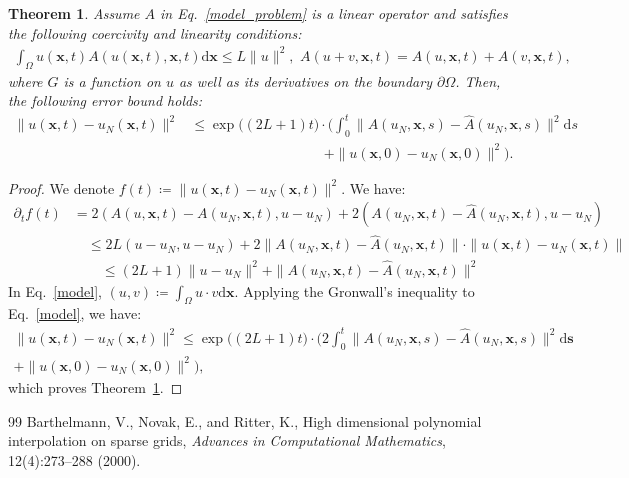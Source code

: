 \documentclass[10pt,a4paper]{amsart}
\newtheorem{theorem}{Theorem}
\def\d{\mbox{d}}
\begin{document}
\begin{theorem}
\label{theorem2}
\rm
Assume $A$ in Eq.~\eqref{model_problem} is a linear operator and satisfies the following coercivity and linearity conditions: 
\begin{equation}
\begin{aligned}
    \int_{\Omega} u(\bm{x}, t)A(u(\bm{x}, t), \bm{x}, t)\d\bm{x}\leq  L\|u\|^2,\,\, A(u+v, \bm{x}, t) = A(u, \bm{x}, t)+ A(v, \bm{x}, t),
    \end{aligned}
    \label{A_condition}
\end{equation}
where $G$ is a function on $u$ as well as its derivatives on the boundary $\partial\Omega$.  
Then, the following error bound holds:
\begin{equation}
\begin{aligned}
    \big\|u(\bm{x}, t)-u_N(\bm{x}, t)\big\|^2&\leq \exp\big((2L+1)t\big)\cdot \bigg(\int_0^t \|A(u_N,\bm{x}, s)-\hat{A}(u_N, \bm{x}, s)\|^2\d s \\
    &\hspace{4cm} + \|u(\bm{x}, 0) - u_N(\bm{x}, 0)\|^2\bigg).
    \end{aligned}
\end{equation}
\end{theorem}

\begin{proof}
    We denote $f(t)\coloneqq\|u(\bm{x}, t) - u_N(\bm{x}, t)\|^2$. We have:
    \begin{equation}
    \begin{aligned}
        \partial_t f(t) &= 2(A(u, \bm{x},t) - A(u_N, \bm{x},t), u-u_N) + 2(A(u_N, \bm{x},t) - \hat{A}(u_N, \bm{x},t), u - u_N)\\
        &\quad\leq 2L(u-u_N, u-u_N) +  2\|A(u_N, \bm{x}, t)-\hat{A}(u_N, \bm{x}, t)\|\cdot\|u(\bm{x}, t) - u_N(\bm{x}, t)\|\\
        &\quad\quad\leq (2L+1)\|u-u_N\|^2 + \|A(u_N, \bm{x}, t)-\hat{A}(u_N, \bm{x}, t)\|^2
        \end{aligned}
        \label{model}
    \end{equation}
    In Eq.~\eqref{model}, $(u, v)\coloneqq \int_\Omega u\cdot v\d\bm{x}$. Applying the Gronwall's inequality to Eq.~\eqref{model}, we have:
    \begin{equation}
        \begin{aligned}
        \|u(\bm{x}, t)-u_N(\bm{x}, t)\|^2\leq \exp\big((2L+1)t\big)\cdot \bigg(2 \int_0^t 
         \|A(u_N, \bm{x}, s)-\hat{A}(u_N, \bm{x}, s)\|^2\d\bm{s} \\+ \|u(\bm{x}, 0) - u_N(\bm{x}, 0)\|^2\bigg),
        \end{aligned}
        \label{temporal_error_bound}
    \end{equation}
    which proves Theorem~\ref{theorem2}.
\end{proof}

\begin{thebibliography}{99}
 Barthelmann, V., Novak, E., and Ritter, K., High dimensional polynomial interpolation on sparse grids, \textit{Advances in Computational Mathematics}, 12(4):273--288 (2000).
\end{thebibliography}
\end{document}
